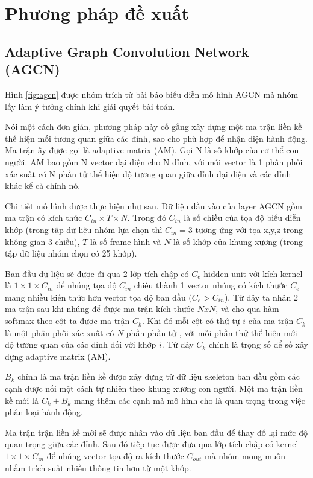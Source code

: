 \section{Phương pháp đề xuất}

\subsection{Adaptive Graph Convolution Network (AGCN)}
Hình \ref{fig:agcn} được nhóm trích từ bài báo \cite{shi2020skeleton} biểu diễn mô hình AGCN mà nhóm lấy làm ý tưởng chính khi giải quyết bài toán.

Nói một cách đơn giản, phương pháp này cố gắng xây dựng một ma trận liền kề thể hiện mối tương quan giữa các đỉnh, sao cho phù hợp để nhận diện hành động. Ma trận ấy được gọi là adaptive matrix (AM). Gọi N là số khớp của cơ thể con người. AM bao gồm N vector đại diện cho N đỉnh, với mỗi vector là 1 phân phối xác suất có N phần tử thể hiện độ tương quan giữa đỉnh đại diện và các đỉnh khác kể cả chính nó.

Chi tiết mô hình được thực hiện như sau. Dữ liệu đầu vào của layer AGCN gồm ma trận có kích thức $C_{in} \times T \times N$. Trong đó $C_{in}$ là số chiều của tọa độ biểu diễn khớp (trong tập dữ liệu nhóm lựa chọn thì $C_{in} = 3$ tương ứng với tọa x,y,z trong không gian 3 chiều), $T$ là số frame hình và $N$ là số khớp của khung xương (trong tập dữ liệu nhóm chọn có 25 khớp).

Ban đầu dữ liệu sẽ được đi qua 2 lớp tích chập có $C_e$ hidden unit với kích kernel là $1 \times 1 \times C_{in}$ để nhúng tọa độ $C_{in}$ chiều thành 1 vector nhúng có kích thước $C_e$ mang nhiều kiến thức hơn vector tọa độ ban đầu ($C_e > C_{in}$). Từ đây ta nhân 2 ma trận sau khi nhúng để được ma trận kích thước $NxN$, và cho qua hàm softmax theo cột ta được ma trận $C_k$. Khi đó mỗi cột có thứ tự $i$ của ma trận $C_k$ là một phân phối xác xuất có $N$ phần phần tử , với mỗi phần thử thể hiện mới độ tương quan của các đỉnh đối với khớp $i$. Từ đây $C_k$ chính là trọng số để số xây dựng adaptive matrix (AM).

$B_k$ chính là ma trận liền kề được xây dựng từ dữ liệu skeleton ban đầu gồm các cạnh được nối một cách tự nhiên theo khung xương con người. Một ma trận liền kề mới là $C_k + B_k$ mang thêm các cạnh mà mô hình cho là quan trọng trong việc phân loại hành động.

Ma trận trận liền kề mới sẽ được nhân vào dữ liệu ban đầu để thay đổ lại mức độ quan trọng giữa các đỉnh. Sau đó tiếp tục được đưa qua lớp tích chập có kernel $1 \times 1 \times C_{in}$ để nhúng vector tọa độ ra kích thước $C_{out}$ mà nhóm mong muốn nhằm trích suất nhiều thông tin hơn từ một khớp.

